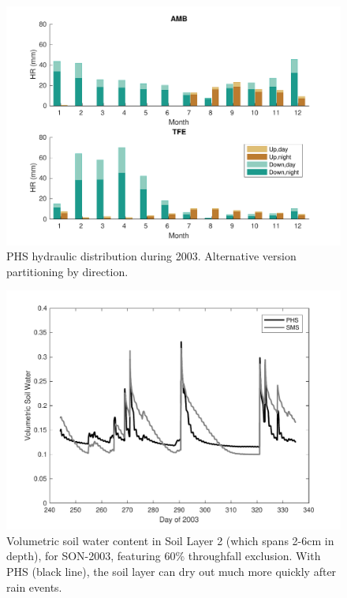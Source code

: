 \documentclass[draft,linenumbers]{agujournal}
\begin{document}
      \begin{figure}[h]
     \centering
     \includegraphics[width=30pc]{../figs2/supphr.pdf}
     \caption{PHS hydraulic distribution during 2003. Alternative version partitioning by direction.}
     \label{supp:hr2}
  \end{figure}
  \clearpage
  
     \clearpage
    \begin{figure}[h]
     \centering
     \includegraphics[width=30pc]{../figs2/supplayer2.pdf}
     \caption{Volumetric soil water content in Soil Layer 2 (which spans 2-6cm in depth), for SON-2003, featuring 60\% throughfall exclusion.
     With PHS (black line), the soil layer can dry out much more quickly after rain events.}
     \label{supp:layer2}
  \end{figure}
\end{document}
